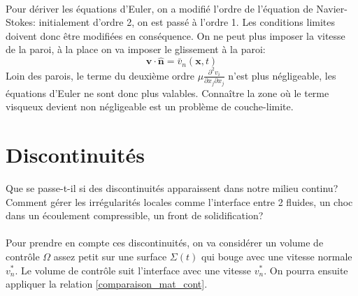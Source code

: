 \paragraph{}
Pour dériver les équations d'Euler, on a modifié l'ordre de l'équation de Navier-Stokes: initialement d'ordre 2, on est passé à l'ordre 1. Les conditions limites doivent donc être modifiées en conséquence. On ne peut plus imposer la vitesse de la paroi, à la place on va imposer le glissement à la paroi: $$\textbf{v}\cdot\hat{\textbf{n}}=\bar{v}_n(\textbf{x},t)$$
Loin des parois, le terme du deuxième ordre $\mu\frac{\partial^2v_i}{\partial x_j\partial x_j}$ n'est plus négligeable, les équations d'Euler ne sont donc plus valables. Connaître la zone où le terme visqueux devient non négligeable est un problème de couche-limite.

\section{Discontinuités}
Que se passe-t-il si des discontinuités apparaissent dans notre milieu continu? Comment gérer les irrégularités locales comme l'interface entre 2 fluides, un choc dans un écoulement compressible, un front de solidification?
\paragraph{}
Pour prendre en compte ces discontinuités, on va considérer un volume de contrôle $\Omega$ assez petit sur une surface $\Sigma(t)$ qui bouge avec une vitesse normale $v^*_n$. Le volume de contrôle suit l'interface avec une vitesse $v^*_n$. On pourra ensuite appliquer la relation \ref{comparaison_mat_cont}.
